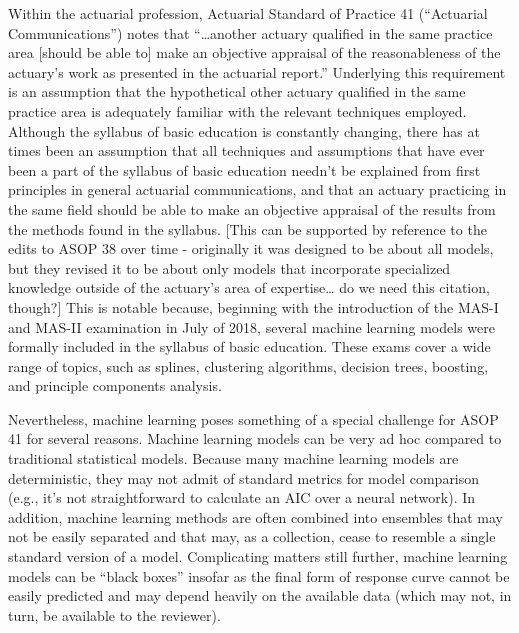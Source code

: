 \documentclass[]{interact}
\theoremstyle{plain}%
\theoremstyle{definition}
\theoremstyle{remark}
\begin{document}
Within the actuarial profession, Actuarial Standard of Practice 41
(``Actuarial Communications'') notes that ``\ldots{}another actuary
qualified in the same practice area {[}should be able to{]} make an
objective appraisal of the reasonableness of the actuary's work as
presented in the actuarial report.'' \citep{asop_41} Underlying this
requirement is an assumption that the hypothetical other actuary
qualified in the same practice area is adequately familiar with the
relevant techniques employed. Although the syllabus of basic education
is constantly changing, there has at times been an assumption that all
techniques and assumptions that have ever been a part of the syllabus of
basic education needn't be explained from first principles in general
actuarial communications, and that an actuary practicing in the same
field should be able to make an objective appraisal of the results from
the methods found in the syllabus. {[}This can be supported by reference
to the edits to ASOP 38 over time - originally it was designed to be
about all models, but they revised it to be about only models that
incorporate specialized knowledge outside of the actuary's area of
expertise\ldots{} do we need this citation, though?{]} This is notable
because, beginning with the introduction of the MAS-I and MAS-II
examination in July of 2018, several machine learning models were
formally included in the syllabus of basic education. These exams cover
a wide range of topics, such as splines, clustering algorithms, decision
trees, boosting, and principle components analysis.
\citep{cas_syllabus_2018}

Nevertheless, machine learning poses something of a special challenge
for ASOP 41 for several reasons. Machine learning models can be very ad
hoc compared to traditional statistical models. Because many machine
learning models are deterministic, they may not admit of standard
metrics for model comparison (e.g., it's not straightforward to
calculate an AIC over a neural network). In addition, machine learning
methods are often combined into ensembles that may not be easily
separated and that may, as a collection, cease to resemble a single
standard version of a model. Complicating matters still further, machine
learning models can be ``black boxes'' insofar as the final form of
response curve cannot be easily predicted and may depend heavily on the
available data (which may not, in turn, be available to the reviewer).
\end{document}
